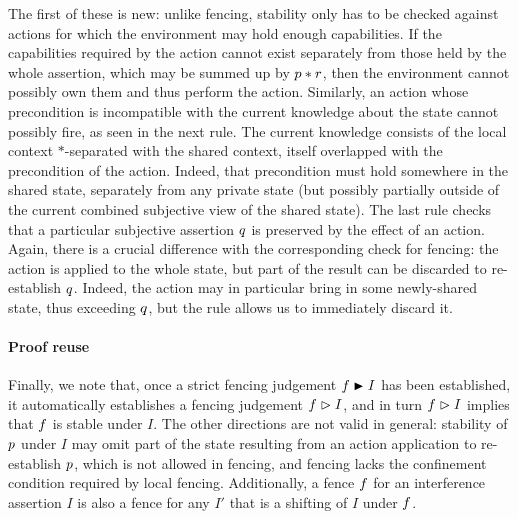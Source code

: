 The first of these is new: unlike fencing, stability only has to be
checked against actions for which the environment may hold enough
capabilities. If the capabilities required by the action cannot exist
separately from those held by the whole assertion, which may be summed
up by $\lass{P} * \lass{R}$, then the environment cannot possibly own
them and thus perform the action. Similarly, an action whose
precondition is incompatible with the current knowledge about the
state cannot possibly fire, as seen in the next rule. The current
knowledge consists of the local context $*$-separated with the shared
context, itself overlapped with the precondition of the
action. Indeed, that precondition must hold somewhere in the shared
state, separately from any private state (but possibly partially
outside of the current combined subjective view of the shared
state). The last rule checks that a particular subjective assertion
$\lass{Q}$ is preserved by the effect of an action. Again, there is a
crucial difference with the corresponding check for fencing: the
action is applied to the whole state, but part of the result can be
discarded to re-establish $\lass{Q}$. Indeed, the action may in
particular bring in some newly-shared state, thus exceeding
$\lass{Q}$, but the \forgetRule rule allows us to immediately discard
it.



\paragraph{Proof reuse}
Finally, we note that, once a strict fencing judgement
$\lass{F}\strictfences I$ has been established, it automatically
establishes a fencing judgement $\lass{F}\fences I$, and in turn
$\lass{F}\fences I$ implies that $\lass{F}$ is stable under
$I$. The other directions are not valid in general: stability of $\lass{P}$
under $I$ may omit part of the state resulting from an action
application to re-establish $\lass{P}$, which is not allowed in fencing, and
fencing lacks the confinement condition required by local
fencing. Additionally, a fence $\lass{F}$ for an interference
assertion $I$ is also a fence for any $I'$ that is a shifting of $I$ under
$\lass{F}$.
\vspace{-10pt}
\begin{mathpar}
  
  
\end{mathpar}
	
